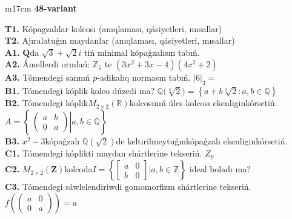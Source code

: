 \documentclass{article}
\begin{document}
\begin{tabular}{m{17cm}}
\textbf{48-variant}
\newline

\textbf{T1.} Kópagzalılar kolcosı (anıqlaması, qásiyetleri, mısallar) \\
\textbf{T2.} Ajıralatuǵın maydanlar (anıqlaması, qásiyetleri, mısallar) \\
\textbf{A1.} \(\mathbf{Q}\)da \(\sqrt{3} + \sqrt{2}i\) tiń minimal kópaǵzalısın tabıń. \\
\textbf{A2.} Ámellerdi orınlań: \(\mathbb{Z}_{5}\) te \(\left( 3x^{2} + 3x - 4 \right)\left( 4x^{2} + 2 \right)\) \\
\textbf{A3.} Tómendegi sannıń \(p\)-adikalıq normasın tabıń. \(|6|_{3} =\) \\
\textbf{B1.} Tómendegi kóplik kolco dúzedi ma? \(\mathbb{Q(}\sqrt[3]{2}) = \left\{ a + b\sqrt[3]{2}:a,b \in \mathbb{Q} \right\}\) \\
\textbf{B2.} Tómendegi kóplik\(M_{2 \times 2}\left( \mathbb{R} \right)\)kolcosınıń úles kolcosı ekenliginkórsetiń. \(A = \left\{ \left. \ \begin{pmatrix}
a & b \\
0 & a
\end{pmatrix} \right|a,b\mathbb{\in Q} \right\}\) \\
\textbf{B3.} \(x^{2} - 3\)kópaǵzalı \(\mathbb{Q}(\sqrt{2})\)de keltirilmeytuǵınkópaǵzalı ekenliginkórsetiń. \\
\textbf{C1.} Tómendegi kóplikti maydan shártlerine tekseriń. \(Z_{p}\) \\
\textbf{C2.} \(M_{2 \times 2}\left( \mathbf{Z} \right)\)kolcoda\(I = \left\{ \begin{bmatrix}
a & 0 \\
b & 0
\end{bmatrix}|a,b\mathbb{\in Z} \right\}\) ideal boladı ma? \\
\textbf{C3.} Tómendegi sáwlelendiriwdi gomomorfizm shártlerine tekseriń. \(f\left( \begin{pmatrix}
a & 0 \\
0 & a
\end{pmatrix} \right) = a\) \\

\end{tabular}
\vspace{1cm}
\end{document}
